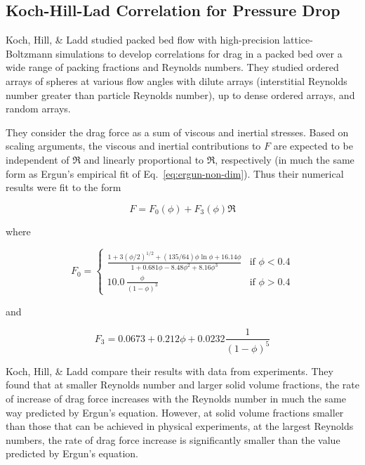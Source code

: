 \subsection{Koch-Hill-Lad Correlation for Pressure Drop}
Koch, Hill, \& Ladd studied packed bed flow with high-precision lattice-Boltzmann simulations to develop correlations for drag in a packed bed over a wide range of packing fractions and Reynolds numbers.\cite{Koch2001,Hill2001a,Hill2001} They studied ordered arrays of spheres at various flow angles with dilute arrays (interstitial Reynolds number greater than particle Reynolds number), up to dense ordered arrays, and random arrays.

They consider the drag force as a sum of viscous and inertial stresses. Based on scaling arguments, the viscous and inertial contributions to $F$ are expected to be independent of $\Re$ and linearly proportional to $\Re$, respectively (in much the same form as Ergun's empirical fit of Eq.~\ref{eq:ergun-non-dim}). Thus their numerical results were fit to the form

\begin{equation}\label{eq:khl-correlation-appendix}
	F = F_0(\phi) + F_3(\phi)\Re
\end{equation}

where 

\begin{equation}
F_0 = \begin{cases}
	\frac{1+3(\phi/2)^{1/2} + (135/64)\phi\ln\phi + 16.14\phi}{1 + 0.681\phi - 8.48 \phi^2 + 8.16\phi^3} & \text{if $\phi < 0.4$}\\
	10.0\,\frac{\phi}{(1-\phi)^3} & \text{if $\phi > 0.4$} 
	\end{cases}
\end{equation}

and

\begin{equation}
	F_3 = 0.0673 + 0.212\phi + 0.0232 \frac{1}{(1-\phi)^5}
\end{equation}

Koch, Hill, \& Ladd\cite{Hill2001, Koch2001, Gruber2012, Benyahia2006} compare their results with data from experiments. They found that at smaller Reynolds number and larger solid volume fractions, the rate of increase of drag force increases with the Reynolds number in much the same way predicted by Ergun’s equation. However, at solid volume fractions smaller than those that can be achieved in physical experiments, at the largest Reynolds numbers, the rate of drag force increase is significantly smaller than the value predicted by Ergun's equation.


